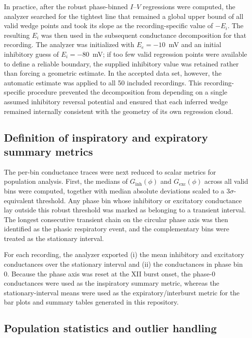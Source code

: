 \documentclass[
]{article}
\begin{document}
In practice, after the robust phase-binned \(I\)--\(V\) regressions were computed, the analyzer searched for the tightest line that remained a global upper bound of all valid wedge points and took its slope as the recording-specific value of \(- E_{i}\). The resulting \(E_{i}\) was then used in the subsequent conductance decomposition for that recording. The analyzer was initialized with \(E_{e} = - 10\)~mV and an initial inhibitory guess of \(E_{i} = - 80\)~mV; if too few valid regression points were available to define a reliable boundary, the supplied inhibitory value was retained rather than forcing a geometric estimate. In the accepted data set, however, the automatic estimate was applied to all 50 included recordings. This recording-specific procedure prevented the decomposition from depending on a single assumed inhibitory reversal potential and ensured that each inferred wedge remained internally consistent with the geometry of its own regression cloud.

\subsection{Definition of inspiratory and expiratory summary metrics}\label{definition-of-inspiratory-and-expiratory-summary-metrics}

The per-bin conductance traces were next reduced to scalar metrics for population analysis. First, the medians of \(G_{\mathrm{inh}}(\phi)\) and \(G_{\mathrm{exc}}(\phi)\) across all valid bins were computed, together with median absolute deviations scaled to a \(3\sigma\)-equivalent threshold. Any phase bin whose inhibitory or excitatory conductance lay outside this robust threshold was marked as belonging to a transient interval. The longest consecutive transient chain on the circular phase axis was then identified as the phasic respiratory event, and the complementary bins were treated as the stationary interval.

For each recording, the analyzer exported (i) the mean inhibitory and excitatory conductances over the stationary interval and (ii) the conductances in phase bin 0. Because the phase axis was reset at the XII burst onset, the phase-0 conductances were used as the inspiratory summary metric, whereas the stationary-interval means were used as the expiratory/interburst metric for the bar plots and summary tables generated in this repository.

        \subsection{Population statistics and outlier handling}\label{population-statistics-and-outlier-handling}
\end{document}
